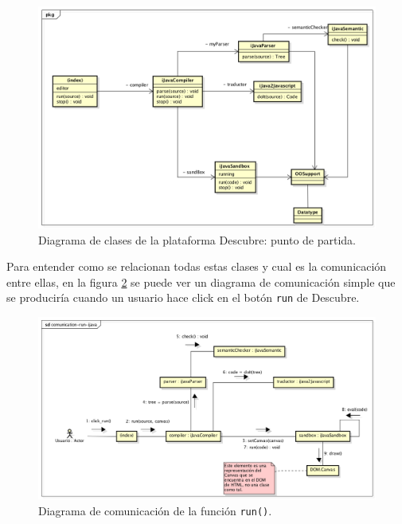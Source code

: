 \begin{figure}[!ht]
	\begin{centering}
		\includegraphics[width=1\textwidth]{images/diagram-ijava.png}
			\caption{Diagrama de clases de la plataforma Descubre: punto de partida.}
				\label{fig:diagram-ijava}
	\end{centering}
\end{figure}

Para entender como se relacionan todas estas clases y cual es la comunicación entre ellas, en la figura \ref{fig:comunication-ijava} se puede ver un diagrama de comunicación simple que se produciría cuando un usuario hace click en el botón \texttt{run} de Descubre.

\begin{figure}[!ht]
	\begin{centering}
		\includegraphics[width=1\textwidth]{images/comunication-run-ijava.png}
			\caption{Diagrama de comunicación de la función \texttt{run()}.}
				\label{fig:comunication-ijava}
	\end{centering}
\end{figure}

